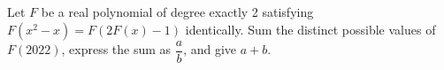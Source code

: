 Let $F$ be a real polynomial of degree exactly 2 satisfying $F(x^2-x)=F(2F(x)-1)$ identically. Sum the distinct possible values of $F(2022)$, express the sum as $\dfrac{a}{b}$, and give $a+b$.

